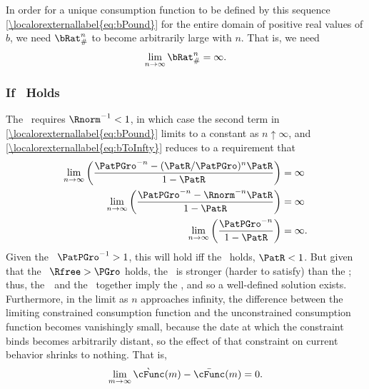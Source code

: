 \documentclass[\econtexRoot/BufferStockTheory]{subfiles}
\begin{document}
In order for a unique consumption function to be defined by this
sequence \eqref{\localorexternallabel{eq:bPound}} for the entire domain of positive real
values of $b$, we need $\bRat_{\#}^{n}$ to become arbitrarily large with
$n$.  That is, we need
\begin{equation}\begin{gathered}\begin{aligned}
  \lim_{n \rightarrow \infty} \bRat_{\#}^{n} = \infty. \label{eq:bToInfty}
\end{aligned}\end{gathered}\end{equation}

\subsubsection{If \FHWC~Holds}
The \FHWC~requires $\Rnorm^{-1} < 1$, in which case the second term in \eqref{\localorexternallabel{eq:bPound}} limits to a constant as $n \uparrow \infty$, and \eqref{\localorexternallabel{eq:bToInfty}} reduces to a requirement that
\begin{eqnarray*}
  \lim_{n \rightarrow \infty} \left(\frac{\PatPGro^{-n}-(\PatR/\PatPGro)^{n}\PatR}{1-\PatR}\right)  & = \infty
  \\  \lim_{n \rightarrow \infty} \left(\frac{\PatPGro^{-n}-\Rnorm^{-n}\PatR}{1-\PatR}\right)  & = \infty
  \\  \lim_{n \rightarrow \infty} \left(\frac{\PatPGro^{-n}}{1-\PatR}\right)  & = \infty.
\end{eqnarray*}
Given the \PFGIC~$\PatPGro^{-1}>1$, this will hold iff the \RIC~holds, $\PatR < 1$.  But given that the \FHWC~$\Rfree > \PGro$ holds, the \PFGIC~is stronger (harder to satisfy) than the \RIC; thus, the~\FHWC~and the \PFGIC~together imply the \RIC, and so a well-defined
solution exists.  Furthermore, in the limit as $n$ approaches
infinity, the difference between the limiting constrained consumption
function and the unconstrained consumption function becomes
vanishingly small, because the date at which the constraint binds
becomes arbitrarily distant, so the effect of that constraint on current
behavior shrinks to nothing.  That is,
\begin{equation}\begin{gathered}\begin{aligned}
  \lim_{m \rightarrow \infty}\grave{\cFunc}(m) - \bar{\cFunc}(m) = 0.
\end{aligned}\end{gathered}\end{equation}
\end{document}
